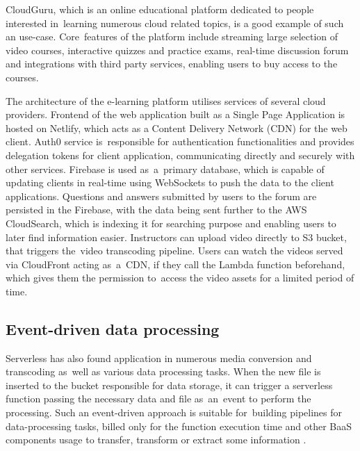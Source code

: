 CloudGuru, which is an online educational platform dedicated to people interested in~learning numerous cloud related topics, is a good example of such an use-case. Core~features of the platform include streaming large selection of video courses, interactive quizzes and practice exams, real-time discussion forum and integrations with third party services, enabling users to buy access to the courses.

The architecture of the e-learning platform utilises services of several cloud providers. Frontend of the web application built as a Single Page Application is hosted on Netlify, which acts as a Content Delivery Network (CDN) for the web client. Auth0 service is~responsible for authentication functionalities and provides delegation tokens for client application, communicating directly and securely with other services. Firebase is used as~a~primary database, which is capable of updating clients in real-time using WebSockets to push the data to the client applications. Questions and answers submitted by users to the forum are persisted in the Firebase, with the data being sent further to the AWS CloudSearch, which is indexing it for searching purpose and enabling users to later find information easier. Instructors can upload video directly to S3 bucket, that triggers the~video transcoding pipeline. Users can watch the videos served via CloudFront acting as~a~CDN, if they call the Lambda function beforehand, which gives them the permission to~access the video assets for a limited period of time.

\subsection{Event-driven data processing} \label{chapter:serverless-example-event-drive-processing}

Serverless has also found application in numerous media conversion and transcoding as~well as various data processing tasks. When the new file is inserted to the bucket responsible for data storage, it can trigger a serverless function passing the necessary data and file as~an~event to perform the processing. Such an event-driven approach is suitable for~building pipelines for data-processing tasks, billed only for the function execution time and other BaaS components usage to transfer, transform or extract some information \cite{ServerlessArchitectureOnAWS}.

